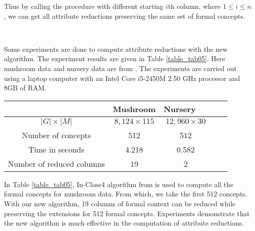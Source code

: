 \documentclass[11pt]{article}
\numberwithin{equation}{subsection}
\begin{document}
 Thus by calling the procedure with different starting $i$th column, where $1\leq i\leq n$, we can get all attribute reductions  preserving the same set of  formal concepts.

 \

Some experiments are done  to compute attribute reductions with the new  algorithm.
The   experiment results are given in Table \ref{table_tab05}. Here mushroom data and nursery data are from \cite{Frank}.
The experiments are carried out using a laptop computer with an Intel Core i5-2450M 2.50 GHz processor and 8GB of RAM.

 \begin{table*}[ht]
            \begin{center}
                \begin{normalsize}
                    \caption{Computation of attribute reductions with the new  algorithm}
                    \label{table_tab05}
                    \begin{tabular}
                        { c c c  c  c  }
                        \hline
                            & Mushroom       &  Nursery        \ \  \\
                       \hline
$|G|\times |M|$ & $8,124\times 115$   & $12,960\times 30$  &        \\

 Number of concepts  & 512               &  512                       \\

 Time in seconds & 4.218                  &  0.582                            \\

 Number of reduced columns & 19                 &   2                        \\
\hline
                    \end{tabular}
                \end{normalsize}
            \end{center}
        \end{table*}

In Table \ref{table_tab05}, In-Close4 algorithm from \cite{Andrews17} is used to compute all the formal concepts for mushroom data. From which, we take the first 512  concepts.  With our new  algorithm, 19 columns of formal context can be reduced while preserving the extensions for 512 formal concepts. Experiments demonstrate that the new algorithm is much  effective in the computation of attribute reductions.
\end{document}
